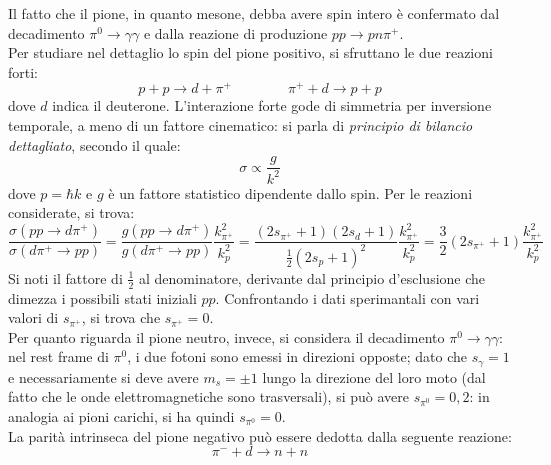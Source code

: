 Il fatto che il pione, in quanto mesone, debba avere spin intero è confermato dal decadimento $ \pi^0 \rightarrow \gamma \gamma $ e dalla reazione di produzione $ p p \rightarrow p n \pi^+ $.\\
Per studiare nel dettaglio lo spin del pione positivo, si sfruttano le due reazioni forti:
\begin{equation*}
	p + p \rightarrow d + \pi^+
	\qquad \qquad
	\pi^+ + d \rightarrow p + p
\end{equation*}
dove $ d $ indica il deuterone. L'interazione forte gode di simmetria per inversione temporale, a meno di un fattore cinematico: si parla di \textit{principio di bilancio dettagliato}, secondo il quale:
\begin{equation}
	\sigma \propto \frac{g}{k^2}
	\label{eq:9.4}
\end{equation}
dove $ p = \hbar k $ e $ g $ è un fattore statistico dipendente dallo spin. Per le reazioni considerate, si trova:
\begin{equation*}
	\frac{\sigma(pp \rightarrow d\pi^+)}{\sigma(d\pi^+ \rightarrow pp)} = \frac{g(pp \rightarrow d\pi^+)}{g(d\pi^+ \rightarrow pp)} \frac{k_{\pi^+}^2}{k_p^2} = \frac{(2s_{\pi^+} + 1)(2s_d + 1)}{\frac{1}{2} (2s_p + 1)^2} \frac{k_{\pi^+}^2}{k_p^2} = \frac{3}{2} \left( 2s_{\pi^+} + 1 \right) \frac{k_{\pi^+}^2}{k_p^2}
\end{equation*}
Si noti il fattore di $ \frac{1}{2} $ al denominatore, derivante dal principio d'esclusione che dimezza i possibili stati iniziali $ pp $. Confrontando i dati sperimantali con vari valori di $ s_{\pi^+} $, si trova che $ s_{\pi^+} = 0 $.\\
Per quanto riguarda il pione neutro, invece, si considera il decadimento $ \pi^0 \rightarrow \gamma \gamma $: nel rest frame di $ \pi^0 $, i due fotoni sono emessi in direzioni opposte; dato che $ s_{\gamma} = 1 $ e necessariamente si deve avere $ m_s = \pm 1 $ lungo la direzione del loro moto (dal fatto che le onde elettromagnetiche sono trasversali), si può avere $ s_{\pi^0} = 0,2 $: in analogia ai pioni carichi, si ha quindi $ s_{\pi^0} = 0 $.\\
La parità intrinseca del pione negativo può essere dedotta dalla seguente reazione:
\begin{equation*}
	\pi^- + d \rightarrow n + n
\end{equation*}
